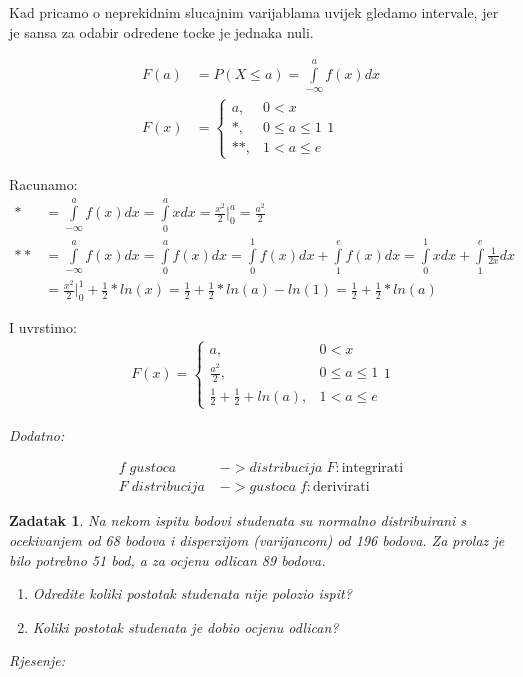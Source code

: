 \documentclass{report}
\newcommand{\rjesenje}{\begin{flushleft}\it Rjesenje:\end{flushleft}}
\newcommand{\onespace}{\vspace{1pc}}
\theoremstyle{plain}
\newtheorem{thm}{Zadatak}[chapter] %
\begin{document}
Kad pricamo o neprekidnim slucajnim varijablama uvijek gledamo intervale,
jer je sansa za odabir odredene tocke je jednaka nuli.

\onespace

\begin{align*}
    F(a)&=P(X\leq a)=\int\limits_{-\infty}^a f(x)dx \\
    F(x)&=\left\{
        \begin{matrix} 
            a, &0 < x \\ 
            *, & 0 \leq a \leq 1 \\ 
            **, & 1 < a \leq e
        \end{matrix}1\right.
\end{align*}

Racunamo:
\begin{align*}
    * &= \int\limits_{-\infty}^a f(x)dx = \int\limits_0^a x dx = \frac{x^2}{2}\Biggr|_{0}^{a}=\frac{a^2}{2} \\
    ** &= \int\limits_{-\infty}^a f(x)dx = \int\limits_0^a f(x) dx = \int\limits_0^1 f(x) dx + \int\limits_1^e f(x) dx = \int\limits_0^1 x dx + \int\limits_1^e \frac{1}{2x} dx \\
    &= \frac{x^2}{2}\Biggr|_{0}^{1} +\frac{1}{2} * ln(x) = \frac{1}{2} + \frac{1}{2} * ln(a) - ln(1) = \frac{1}{2} + \frac{1}{2} * ln(a) 
\end{align*}

I uvrstimo:
\begin{align*}
    F(x)=\left\{
        \begin{matrix} 
            a, &0 < x \\ 
            \frac{a^2}{2}, & 0 \leq a \leq 1 \\ 
            \frac{1}{2}+\frac{1}{2}+ln(a), & 1 < a \leq e
        \end{matrix}1\right.
\end{align*}

\begin{flushleft}\it Dodatno:\end{flushleft}
\begin{align*}
    f \; gustoca \;&-> distribucija \;F :\text{integrirati} \\
    F \; distribucija \; &-> gustoca \; f :\text{derivirati}
\end{align*}

\onespace
\begin{thm}Na nekom ispitu bodovi studenata su normalno distribuirani s ocekivanjem
    od 68 bodova i disperzijom (varijancom) od 196 bodova. Za prolaz je bilo potrebno
    51 bod, a za ocjenu odlican 89 bodova.
    \begin{enumerate}[label=(\alph*)]
        \item Odredite koliki postotak studenata nije polozio ispit?
        \item Koliki postotak studenata je dobio ocjenu odlican?
    \end{enumerate}
\end{thm} 
\rjesenje
\end{document}
